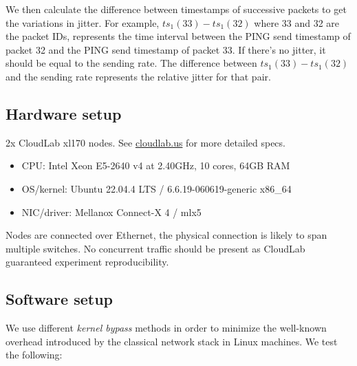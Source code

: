 \documentclass{article}
\begin{document}
We then calculate the difference between timestamps of successive packets
to get the variations in jitter. For example, $ts_1(33) - ts_1(32)$ where 33 and
32 are the packet IDs, represents the time interval between the PING send timestamp
of packet 32 and the PING send timestamp of packet 33. If there's no jitter,
it should be equal to the sending rate. The difference between $ts_1(33) - ts_1(32)$
and the sending rate represents the relative jitter for that pair. 

\subsection{Hardware setup}
2x CloudLab xl170 nodes. See \href{cloudlab.us}{cloudlab.us}
for more detailed specs.

\begin{itemize}
  \itemsep=-0.8mm
  \item CPU:  Intel Xeon E5-2640 v4 at 2.40GHz, 10 cores, 64GB RAM
  \item OS/kernel: Ubuntu 22.04.4 LTS / 6.6.19-060619-generic x86\_64
  \item NIC/driver: Mellanox Connect-X 4 / mlx5 
\end{itemize}




Nodes are connected over Ethernet, the physical connection is likely to span multiple
switches. No concurrent traffic should be present as CloudLab guaranteed 
experiment reproducibility.

\subsection{Software setup}
\label{sec:software}
We use different \textit{kernel bypass} methods in order to minimize the 
well-known overhead introduced by the classical network stack in Linux machines.
We test the following: 
\end{document}
